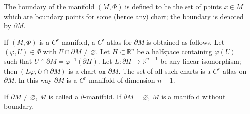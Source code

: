 The boundary of the manifold $(M, \Phi)$ is defined to be the set of points $x \in M$ which are boundary points for some (hence any) chart; the boundary is denoted by $\partial M$.

If $(M, \Phi)$ is a $C^r$ manifold, a $C^r$ atlas for $\partial M$ is obtained as follows. Let $(\varphi, U) \in \Phi$ with $U \cap \partial M \neq \varnothing$. Let $H \subset \mathbb{R}^n$ be a halfspace containing $\varphi(U)$ such that $U \cap \partial M = \varphi^{-1}(\partial H)$. Let $L: \partial H \to \mathbb{R}^{n-1}$ be any linear isomorphism; then $(L\varphi, U \cap \partial M)$ is a chart on $\partial M$. The set of all such charts is a $C^r$ atlas on $\partial M$. In this way $\partial M$ is a $C^r$ manifold of dimension $n-1$.

If $\partial M \neq \varnothing$, $M$ is called a $\partial$-manifold. If $\partial M = \varnothing$, $M$ is a manifold without boundary.
